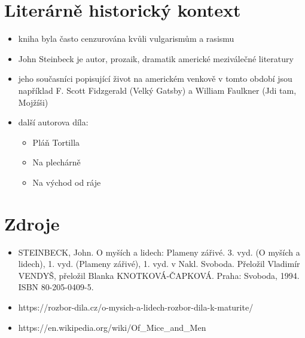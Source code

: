 \documentclass[10pt,a4paper]{article}
\begin{document}
\section*{Literárně historický kontext}
\begin{itemize}
\item kniha byla často cenzurována kvůli vulgarismům a rasismu
\item John Steinbeck je autor, prozaik, dramatik americké meziválečné literatury
\item jeho současníci popisující život na americkém venkově v tomto období jsou například F. Scott Fidzgerald (Velký Gatsby) a William Faulkner (Jdi tam, Mojžíši)
\item další autorova díla:
	\begin{itemize}
	\item Pláň Tortilla
	\item Na plechárně
	\item Na východ od ráje
	\end{itemize}
\end{itemize}
\section*{Zdroje}
\begin{itemize}
\item STEINBECK, John. O myších a lidech: Plameny zářivé. 3. vyd. (O myších a lidech), 1. vyd. (Plameny zářivé), 1. vyd. v Nakl. Svoboda. Přeložil Vladimír VENDYŠ, přeložil Blanka KNOTKOVÁ-ČAPKOVÁ. Praha: Svoboda, 1994. ISBN 80-205-0409-5.
\item https://rozbor-dila.cz/o-mysich-a-lidech-rozbor-dila-k-maturite/
\item https://en.wikipedia.org/wiki/Of\_Mice\_and\_Men
\end{itemize}
\end{document}

